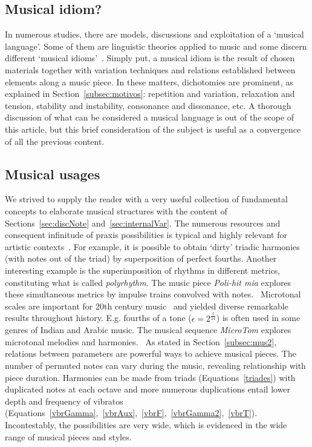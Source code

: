 \subsection{Musical idiom?}
In numerous studies, there are models, discussions and exploitation of a `musical language'.
Some of them are linguistic theories applied to music
and some discern different `musical
idioms'~\cite{Lerdahl, Harmonia, Salzer,Alfaix}. Simply put, a musical idiom
is the result of chosen materials together with variation techniques and
relations established between elements along a music piece. In these matters,
dichotomies are prominent, as explained in Section~\ref{subsec:motivos}:
repetition and variation, relaxation and tension, stability and instability, consonance and dissonance, etc.
A thorough discussion of what can be considered a musical language is out of the scope of this article, but this brief consideration of the subject is useful as a convergence of all the previous content.

\subsection{Musical usages}\label{subsec:usosmusicais3}
We strived to supply the reader with a very useful collection of
fundamental concepts to elaborate musical structures
with the content of Sections~\ref{sec:discNote} and~\ref{sec:internalVar}.
The numerous resources and consequent infinitude
of praxis possibilities is typical and highly relevant for artistic contexts~\cite{Harmonia,Webern}.
For example, it is possible to obtain `dirty' triadic harmonies (with notes out of the triad) by superposition of perfect fourths.
Another interesting example is the superimposition of rhythms in different metrics, constituting what is
called \emph{polyrhythm}. The music piece \emph{Poli-hit mia} explores these simultaneous metrics by impulse trains convolved with notes.~\cite{MASSA} 
Microtonal scales are important for 20th
century music~\cite{microtonalidade} and yielded diverse remarkable results throughout history.
E.g.
fourths of a tone ($\epsilon=2^{\frac{1}{24}}$) is often used in some genres of Indian and Arabic music.
The musical sequence \emph{MicroTom} explores microtonal melodies and harmonies.~\cite{MASSA}
As stated in Section~\ref{subsec:mus2}, relations between
parameters are powerful ways to achieve musical pieces.
The number of permuted
notes can vary during the music, revealing relationship with piece
duration. Harmonies can be made from triads (Equations~\ref{triades}) with duplicated
notes at each octave and more numerous duplications entail lower depth and frequency of
vibratos (Equations~\ref{vbrGamma},~\ref{vbrAux},~\ref{vbrF},~\ref{vbrGamma2},~\ref{vbrT}).
Incontestably, the possibilities are very wide, which is evidenced in the wide range of musical pieces and styles.

